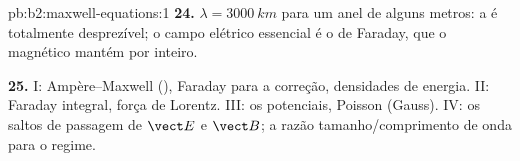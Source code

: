 \begin{solution}{pb:b2:maxwell-equations:1}
\textbf{24.} $\lambda = \qty{3000}{km}$ para um anel de alguns metros: a  é totalmente desprezível; o campo elétrico essencial é o
de Faraday, que o  magnético mantém por inteiro.

\textbf{25.} I: Ampère--Maxwell (), Faraday para
a correção, densidades de energia. II: Faraday integral, força de Lorentz.
III: os potenciais, Poisson (Gauss). IV: os saltos de passagem de $\vect E$
e $\vect B$; a razão tamanho/comprimento de onda para o regime.
\end{solution}
